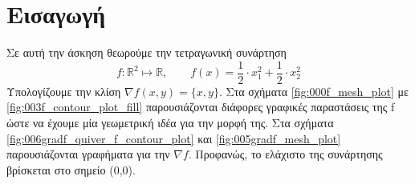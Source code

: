 \chapter{Εισαγωγή} \label{intro}

Σε αυτή την άσκηση θεωρούμε την τετραγωνική συνάρτηση
\begin{equation*}
	f:\mathbb{R}^{2} \mapsto \mathbb{R}, \qquad f(x) = \frac{1}{2} \cdot x_1 ^ 2 + \frac{1}{2} \cdot x_2^2
\end{equation*}
Υπολογίζουμε την κλίση $\nabla f(x, y) = \{x, y\}$. \newline
Στα σχήματα \ref{fig:000f_mesh_plot} με \ref{fig:003f_contour_plot_fill} παρουσιάζονται διάφορες γραφικές παραστάσεις της f ώστε να έχουμε μία γεωμετρική ιδέα για την μορφή της. Στα σχήματα \ref{fig:006gradf_quiver_f_contour_plot} και \ref{fig:005gradf_mesh_plot} παρουσιάζονται γραφήματα για την $\nabla f$. \newline
Προφανώς, το ελάχιστο της συνάρτησης βρίσκεται στο σημείο (0,0).

